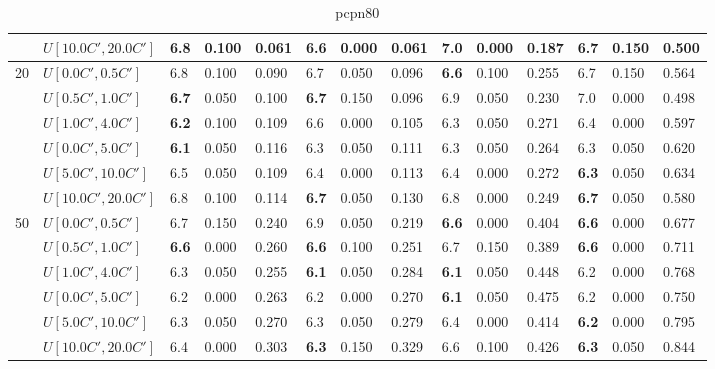 \begin{table}[h]
{\begin{tabular}{|l|l||l|l|l||l|l|l||l|l|l||l|l|l|}
       & $U[10.0C',20.0C']$ & 6.8 & 0.100 & 0.061 & \textbf{6.6} & 0.000 & 0.061 & 7.0 & 0.000 & 0.187 & 6.7 & 0.150 & 0.500 \\
      \hline\hline
      \multirow{6}{*}{20} & $U[0.0C',0.5C']$ & 6.8 & 0.100 & 0.090 & 6.7 & 0.050 & 0.096 & \textbf{6.6} & 0.100 & 0.255 & 6.7 & 0.150 & 0.564 \\
       & $U[0.5C',1.0C']$ & \textbf{6.7} & 0.050 & 0.100 & \textbf{6.7} & 0.150 & 0.096 & 6.9 & 0.050 & 0.230 & 7.0 & 0.000 & 0.498 \\
       & $U[1.0C',4.0C']$ & \textbf{6.2} & 0.100 & 0.109 & 6.6 & 0.000 & 0.105 & 6.3 & 0.050 & 0.271 & 6.4 & 0.000 & 0.597 \\
       & $U[0.0C',5.0C']$ & \textbf{6.1} & 0.050 & 0.116 & 6.3 & 0.050 & 0.111 & 6.3 & 0.050 & 0.264 & 6.3 & 0.050 & 0.620 \\
       & $U[5.0C',10.0C']$ & 6.5 & 0.050 & 0.109 & 6.4 & 0.000 & 0.113 & 6.4 & 0.000 & 0.272 & \textbf{6.3} & 0.050 & 0.634 \\
       & $U[10.0C',20.0C']$ & 6.8 & 0.100 & 0.114 & \textbf{6.7} & 0.050 & 0.130 & 6.8 & 0.000 & 0.249 & \textbf{6.7} & 0.050 & 0.580 \\
      \hline\hline
      \multirow{6}{*}{50} & $U[0.0C',0.5C']$ & 6.7 & 0.150 & 0.240 & 6.9 & 0.050 & 0.219 & \textbf{6.6} & 0.000 & 0.404 & \textbf{6.6} & 0.000 & 0.677 \\
       & $U[0.5C',1.0C']$ & \textbf{6.6} & 0.000 & 0.260 & \textbf{6.6} & 0.100 & 0.251 & 6.7 & 0.150 & 0.389 & \textbf{6.6} & 0.000 & 0.711 \\
       & $U[1.0C',4.0C']$ & 6.3 & 0.050 & 0.255 & \textbf{6.1} & 0.050 & 0.284 & \textbf{6.1} & 0.050 & 0.448 & 6.2 & 0.000 & 0.768 \\
       & $U[0.0C',5.0C']$ & 6.2 & 0.000 & 0.263 & 6.2 & 0.000 & 0.270 & \textbf{6.1} & 0.050 & 0.475 & 6.2 & 0.000 & 0.750 \\
       & $U[5.0C',10.0C']$ & 6.3 & 0.050 & 0.270 & 6.3 & 0.050 & 0.279 & 6.4 & 0.000 & 0.414 & \textbf{6.2} & 0.000 & 0.795 \\
       & $U[10.0C',20.0C']$ & 6.4 & 0.000 & 0.303 & \textbf{6.3} & 0.150 & 0.329 & 6.6 & 0.100 & 0.426 & \textbf{6.3} & 0.050 & 0.844 \\
      \hline
      \end{tabular}
      }
      \caption{pcpn80}
      \label{tab:pcpn80}\end{table}


